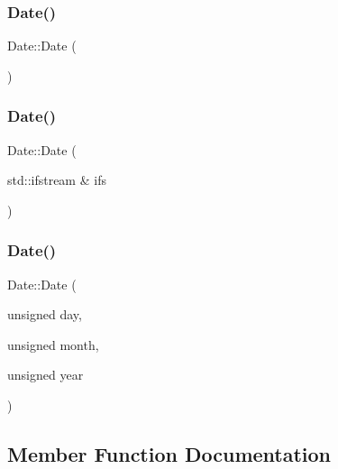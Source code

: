 \subsubsection{\texorpdfstring{Date()}{Date()}\hspace{0.1cm}{\footnotesize\ttfamily [1/3]}}
{\footnotesize\ttfamily Date\+::\+Date (\begin{DoxyParamCaption}{ }\end{DoxyParamCaption})}

\mbox{\label{classDate_a5e72c9e6a4e666e260e989c2fd16beaf}} 
\subsubsection{\texorpdfstring{Date()}{Date()}\hspace{0.1cm}{\footnotesize\ttfamily [2/3]}}
{\footnotesize\ttfamily Date\+::\+Date (\begin{DoxyParamCaption}\item[{std\+::ifstream \&}]{ifs }\end{DoxyParamCaption})}

\mbox{\label{classDate_a6e4979dfc71c09cdab0b65a734e4a4df}} 
\subsubsection{\texorpdfstring{Date()}{Date()}\hspace{0.1cm}{\footnotesize\ttfamily [3/3]}}
{\footnotesize\ttfamily Date\+::\+Date (\begin{DoxyParamCaption}\item[{unsigned}]{day,  }\item[{unsigned}]{month,  }\item[{unsigned}]{year }\end{DoxyParamCaption})}



\subsection{Member Function Documentation}
\mbox{\label{classDate_a0480cc260643a23afe2eb7671d6c5e79}} 
